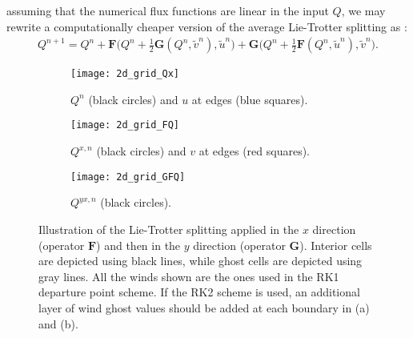 assuming that the numerical flux functions are linear in the input $Q$, we may rewrite a computationally cheaper version
of the average Lie-Trotter splitting as \citep{lin:1996}:
\begin{align}
	\label{chp3-avlt}
	Q^{n+1} =  Q^n+
	\mathbf{F}\bigg(Q^n + \frac{1}{2}\mathbf{G}(Q^n, \tilde{v}^n), \tilde{u}^n \bigg) +  
	\mathbf{G}\bigg(Q^n + \frac{1}{2}\mathbf{F}(Q^n, \tilde{u}^n), \tilde{v}^n \bigg).
\end{align}
\begin{figure}[!htb]
	\centering
	\begin{subfigure}{0.3\textwidth}
		\centering
		\texttt{[image: 2d\_grid\_Qx]}
		\caption{$Q^n$ (black circles) and $u$ at edges (blue squares). \label{lt-Qx}}
	\end{subfigure}
	\begin{subfigure}{0.3\textwidth}
		\centering
		\texttt{[image: 2d\_grid\_FQ]}
		\caption{$Q^{x,n}$ (black circles) and $v$ at edges (red squares).\label{lt-FQx} }
	\end{subfigure}
	\begin{subfigure}{0.3\textwidth}
	    \centering
	    \texttt{[image: 2d\_grid\_GFQ]}
		\caption{$Q^{yx,n}$ (black circles). \label{lt-GFQx}}
    \end{subfigure}
	\caption{Illustration of the Lie-Trotter splitting applied in the $x$ direction (operator $\mathbf{F}$)
	and then in the $y$ direction (operator $\mathbf{G}$). Interior cells are depicted using black lines,
	 while ghost cells are depicted using gray lines. 
	 All the winds shown are the ones used in the RK1 departure point scheme.
	 If the RK2 scheme is used, an additional layer of wind ghost values should be added at each boundary in (a) and (b). \label{ltxdir}}
\end{figure}

